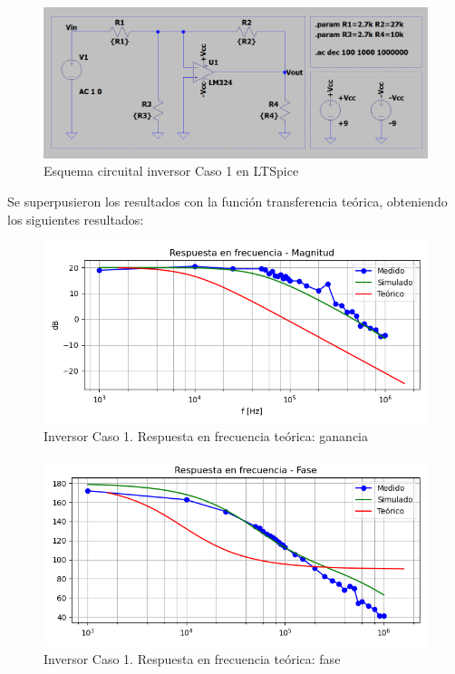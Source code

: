 \begin{figure}[H]
	\centering
	\includegraphics[scale=0.35]{./Imagenes/simuInv1.png}
	\caption{Esquema circuital inversor Caso 1 en LTSpice}
	\label{fig:circinvcaso1}
\end{figure}

Se superpusieron los resultados con la función transferencia teórica, obteniendo los siguientes resultados:

\begin{figure}[H]
	\centering
		\includegraphics[width=.8\linewidth]{./Imagenes/InvCaso1Gain.png}  
		\caption{Inversor Caso 1. Respuesta en frecuencia teórica: ganancia}
	\label{fig:circinvcaso1}
\end{figure}

\begin{figure}[H]
	\centering
		\includegraphics[width=.8\linewidth]{./Imagenes/InvCaso1Phase.png}  
		\caption{Inversor Caso 1. Respuesta en frecuencia teórica: fase}
	\label{fig:circinvcaso1}
\end{figure}


